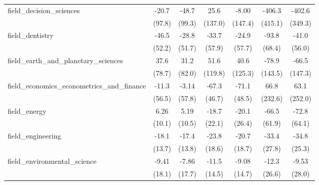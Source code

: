 \begin{tabular}{lcccccc}
   field\_decision\_sciences                                   & -20.7         & -48.7       & 25.6           & -8.00         & -406.3       & -402.6\\   
                                                               & (97.8)        & (99.3)      & (137.0)        & (147.4)       & (415.1)      & (349.3)\\   
   field\_dentistry                                            & -46.5         & -28.8       & -33.7          & -24.9         & -93.8        & -41.0\\   
                                                               & (52.2)        & (51.7)      & (57.9)         & (57.7)        & (68.4)       & (56.0)\\   
   field\_earth\_and\_planetary\_sciences                      & 37.6          & 31.2        & 51.6           & 40.6          & -78.9        & -66.5\\   
                                                               & (78.7)        & (82.0)      & (119.8)        & (125.3)       & (143.5)      & (147.3)\\   
   field\_economics\_econometrics\_and\_finance                & -11.3         & -3.14       & -67.3          & -71.1         & 66.8         & 63.1\\   
                                                               & (56.5)        & (57.8)      & (46.7)         & (48.5)        & (232.6)      & (252.0)\\   
   field\_energy                                               & 6.26          & 5.19        & -18.7          & -20.1         & -66.5        & -72.8\\   
                                                               & (10.1)        & (10.5)      & (22.1)         & (26.4)        & (61.9)       & (64.1)\\   
   field\_engineering                                          & -18.1         & -17.4       & -23.8          & -20.7         & -33.4        & -34.8\\   
                                                               & (13.7)        & (13.8)      & (18.6)         & (18.7)        & (27.8)       & (25.3)\\   
   field\_environmental\_science                               & -9.41         & -7.86       & -11.5          & -9.08         & -12.3        & -9.53\\   
                                                               & (18.1)        & (17.7)      & (14.5)         & (14.7)        & (26.6)       & (28.0)\\   

\end{tabular}
